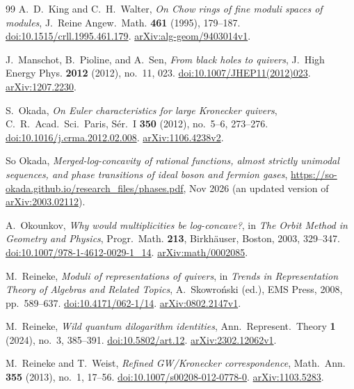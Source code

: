 \documentclass[11pt,a4paper]{article}
\numberwithin{equation}{section}
\theoremstyle{definition}
\theoremstyle{remark}
\begin{document}
\begin{thebibliography}{99}
A.~D.~King and C.~H.~Walter,
\emph{On Chow rings of fine moduli spaces of modules},
J.~Reine Angew.~Math. \textbf{461} (1995), 179--187.
\href{https://doi.org/10.1515/crll.1995.461.179}{doi:10.1515/crll.1995.461.179}.
\href{https://arxiv.org/abs/alg-geom/9403014v1}{arXiv:alg-geom/9403014v1}.

J.~Manschot, B.~Pioline, and A.~Sen,
\emph{From black holes to quivers},
J.~High Energy Phys. \textbf{2012} (2012), no.~11, 023.
\href{https://doi.org/10.1007/JHEP11(2012)023}{doi:10.1007/JHEP11(2012)023}.
\href{https://arxiv.org/abs/1207.2230}{arXiv:1207.2230}.

S.~Okada, \emph{On Euler characteristics for large Kronecker quivers},
C.~R.~Acad.~Sci.~Paris, S\'er.~I \textbf{350} (2012), no.~5--6, 273--276.
\href{https://doi.org/10.1016/j.crma.2012.02.008}{doi:10.1016/j.crma.2012.02.008}.
\href{https://arxiv.org/abs/1106.4238v2}{arXiv:1106.4238v2}.

So Okada, \emph{Merged-log-concavity of rational functions,
almost strictly unimodal sequences, and phase transitions of ideal
boson and fermion gases},
\url{https://so-okada.github.io/research_files/phases.pdf}, Nov 2026
(an updated version of \href{https://arxiv.org/abs/2003.02112}{arXiv:2003.02112}).

A.~Okounkov, \emph{Why would multiplicities be log-concave?},
in \emph{The Orbit Method in Geometry and Physics},
Progr.~Math. \textbf{213}, Birkh\"auser, Boston, 2003, 329--347.
\href{https://doi.org/10.1007/978-1-4612-0029-1_14}{doi:10.1007/978-1-4612-0029-1\_14}.
\href{https://arxiv.org/abs/math/0002085}{arXiv:math/0002085}.

M.~Reineke, \emph{Moduli of representations of quivers},
in \emph{Trends in Representation Theory of Algebras and Related Topics},
A.~Skowro\'nski (ed.), EMS Press, 2008, pp.~589--637.
\href{https://doi.org/10.4171/062-1/14}{doi:10.4171/062-1/14}.
\href{https://arxiv.org/abs/0802.2147v1}{arXiv:0802.2147v1}.

M.~Reineke, \emph{Wild quantum dilogarithm identities},
Ann.~Represent.~Theory \textbf{1} (2024), no.~3, 385--391.
\href{https://doi.org/10.5802/art.12}{doi:10.5802/art.12}.
\href{https://arxiv.org/abs/2302.12062v1}{arXiv:2302.12062v1}.

M.~Reineke and T.~Weist, \emph{Refined GW/Kronecker correspondence},
Math.~Ann. \textbf{355} (2013), no.~1, 17--56.
\href{https://doi.org/10.1007/s00208-012-0778-0}{doi:10.1007/s00208-012-0778-0}.
\href{https://arxiv.org/abs/1103.5283}{arXiv:1103.5283}.


\end{thebibliography}
\end{document}
